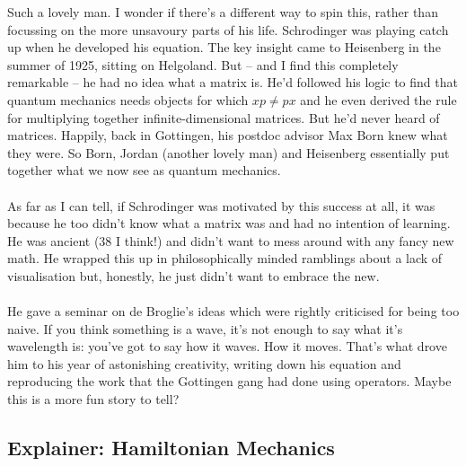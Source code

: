 \documentclass[12pt]{article}
\newcommand\para{\paragraph{}}
\begin{document}
{\color{blue}Such a lovely man. I wonder if there's a different way to spin this, rather than focussing on the more unsavoury parts of his life. Schrodinger was playing catch up when he developed his equation. The key insight came to Heisenberg in the summer of 1925, sitting on Helgoland. But -- and I find this completely remarkable -- he had no idea what a matrix is. He'd followed his logic to find that quantum mechanics needs objects for which $xp\neq px$ and he even derived the rule for multiplying together infinite-dimensional matrices. But he'd never heard of matrices. Happily, back in Gottingen, his postdoc advisor Max Born knew what they were. So Born, Jordan (another lovely man) and Heisenberg essentially put together what we now see as quantum mechanics.

\para
As far as I can tell, if Schrodinger was motivated by this success at all, it was because he too didn't know what a matrix was and had no intention of learning. He was ancient (38 I think!) and didn't want to mess around with any fancy new math. He wrapped this up in philosophically minded ramblings about a lack of visualisation but, honestly, he just didn't want to embrace the new. 

\para
He gave a seminar on de Broglie's ideas which were rightly criticised for being too naive. If you think something is a wave, it's not enough to say what it's wavelength is: you've got to say how it waves. How it moves. That's what drove him to his year of astonishing creativity, writing down his equation and reproducing the work that the Gottingen gang had done using operators. Maybe this is a more fun story to tell?}

\subsection{Explainer: Hamiltonian Mechanics}
\end{document}
